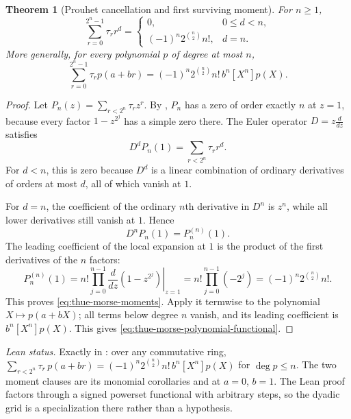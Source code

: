\documentclass[11pt,a4paper,oneside,openany]{book}
\newtheorem{theorem}{Theorem}[chapter]
\theoremstyle{definition}
\theoremstyle{remark}
\begin{document}
\begin{theorem}[Prouhet cancellation and first surviving moment]\label{thm:thue-morse-moments}
For $n\ge1$,
\begin{equation}\label{eq:thue-morse-moments}
 \sum_{r=0}^{2^n-1}\tau_r r^d
 =
 \begin{cases}
  0,&0\le d<n,\\
  (-1)^n2^{\binom n2}n!,&d=n.
 \end{cases}
\end{equation}
More generally, for every polynomial $p$ of degree at most $n$,
\begin{equation}\label{eq:thue-morse-polynomial-functional}
 \sum_{r=0}^{2^n-1}\tau_r p(a+br)
 =(-1)^n2^{\binom n2}n!\,b^n[X^n]p(X).
\end{equation}
\end{theorem}

\begin{proof}
Let
$P_n(z)=\sum_{r<2^n}\tau_rz^r$.  By , $P_n$ has a zero of order exactly $n$ at $z=1$, because every factor $1-z^{2^j}$ has a simple zero there.  The Euler operator $D=z\frac{d}{dz}$ satisfies
\[
 D^dP_n(1)=\sum_{r<2^n}\tau_rr^d.
\]
For $d<n$, this is zero because $D^d$ is a linear combination of ordinary derivatives of orders at most $d$, all of which vanish at $1$.

For $d=n$, the coefficient of the ordinary $n$th derivative in $D^n$ is $z^n$, while all lower derivatives still vanish at $1$.  Hence
\[
 D^nP_n(1)=P_n^{(n)}(1).
\]
The leading coefficient of the local expansion at $1$ is the product of the first derivatives of the $n$ factors:
\[
 P_n^{(n)}(1)
 =n!\prod_{j=0}^{n-1}\left.\frac{d}{dz}(1-z^{2^j})\right|_{z=1}
 =n!\prod_{j=0}^{n-1}(-2^j)
 =(-1)^n2^{\binom n2}n!.
\]
This proves \eqref{eq:thue-morse-moments}.  Apply it termwise to the polynomial $X\mapsto p(a+bX)$; all terms below degree $n$ vanish, and its leading coefficient is $b^n[X^n]p(X)$.  This gives \eqref{eq:thue-morse-polynomial-functional}.
\end{proof}
\emph{Lean status.}  Exactly  in
: over any commutative ring,
\(\sum_{r<2^n}\tau_r\,p(a+br)=(-1)^n2^{\binom n2}n!\,b^n[X^n]p(X)\) for \(\deg p\le n\).  The two
moment clauses are its monomial corollaries 
and  at \(a=0\), \(b=1\).  The Lean proof factors
through a signed powerset functional with arbitrary steps, so the dyadic grid is a specialization
there rather than a hypothesis.
\end{document}
